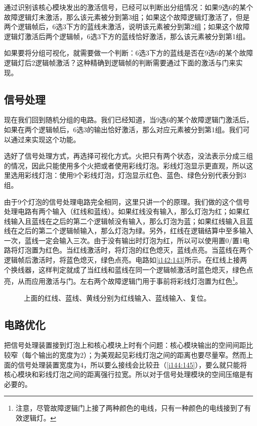 通过识别该核心模块发出的激活信号，已经可以判断出分组情况：如果9选6的某个故障逻辑灯未激活，那么该元素被分到第3组；如果这个故障逻辑灯激活了，但是两个逻辑帧后，6选3下方的蓝线未激活，说明该元素被分到第2组；如果这个故障逻辑灯激活后两个逻辑帧，6选3下方的蓝线恰好激活，那么该元素被分到第1组。

如果要将分组可视化，就需要做一个判断：6选3下方的蓝线是否在9选6的某个故障逻辑灯后2逻辑帧激活？这种精确到逻辑帧的判断需要通过下面的激活与门来实现。

\subsection{信号处理}

现在我们回到随机分组的电路。我们已经知道，当9选6的某个故障逻辑门激活后，如果在两个逻辑帧后，6选3的输出恰好激活，那么对应元素被分到第1组。我们可以通过来实现这个功能。

选好了信号处理方式，再选择可视化方式。火把只有两个状态，没法表示分成三组的情况，因此只能使用多个火把或者使用彩线灯泡。彩线灯泡显示更直观，所以这里选用彩线灯泡：使用9个彩线灯泡，灯泡显示红色、蓝色、绿色分别代表分到3组。

由于9个灯泡的信号处理电路完全相同，这里只讲一个的原理。我们做的这个信号处理电路有两个输入（红线和蓝线）。如果红线没有输入，那么灯泡为红；如果红线输入且蓝线在之后的第二个逻辑帧没有输入，那么灯泡为蓝；如果红线输入且蓝线在之后的第二个逻辑帧输入，那么灯泡为绿。另外，红线在逻辑结算中至多输入一次，蓝线一定会输入三次。由于没有输出时灯泡为红，所以可以使用置0/置1电路将灯泡置为红色。当红线激活时，将灯泡的红色熄灭，蓝线点亮。当蓝线在两个逻辑帧后激活时，将蓝色熄灭，绿色点亮。电路如\autoref{i142:143}所示。在红线上接两个换线器，这样判定就成了当红线和蓝线在同一个逻辑帧激活时蓝色熄灭，绿色点亮，从而应用激活与门。左右两个故障逻辑门用于事前将彩线灯泡置为红色\footnote{注意，尽管故障逻辑门上接了两种颜色的电线，只有一种颜色的电线接到了有效逻辑灯。}。

\begin{figure}[!ht]
  \centering
  \caption{上面的红线、蓝线、黄线分别为红线输入、蓝线输入、复位。}
  \label{i142:143}
\end{figure}

\subsection{电路优化}

把信号处理装置接到灯泡上和核心模块上时有个问题：核心模块输出的空间间距比较窄（每个输出的宽度为2）；为美观起见彩线灯泡之间的距离也要尽量窄。然而上面的信号处理装置宽度为4，所以要么接线会比较丑（\autoref{i144:145}），要么就只能将核心模块和彩线灯泡之间的距离强行拉宽。所以对于信号处理模块的空间压缩是有必要的。

